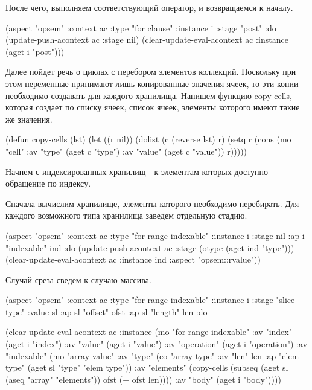 \documentclass[12pt,twoside,russian]{article}
\begin{document}
После чего, выполняем соответствующий оператор, и возвращаемся к началу.

\begin{ABMLCode}
(aspect "opsem" :context ac :type "for clause" :instance i 
  :stage "post" :do 
  (update-push-acontext ac :stage nil)
  (clear-update-eval-acontext ac :instance (aget i "post")))
\end{ABMLCode}

Далее пойдет речь о циклах с перебором элементов коллекций. Поскольку при этом переменные принимают лишь копированные значения ячеек, то эти копии необходимо создавать для каждого хранилища. Напишем функцию copy-cells, которая создает по списку ячеек, список ячеек, элементы которого имеют такие же значения.

\begin{ABMLCode}
(defun copy-cells (lst) 
  (let ((r nil)) (dolist (c (reverse lst) r) 
    (setq r (cons (mo "cell" :av "type" (aget c "type") 
                             :av "value" (aget c "value"))
                  r)))))
\end{ABMLCode}

Начнем с индексированных хранилищ - к элементам которых доступно обращение по индексу.

Сначала вычислим хранилище, элементы которого необходимо перебирать. Для каждого возможного типа хранилища заведем отдельную стадию.

\begin{ABMLCode}
(aspect "opsem" :context ac :type "for range indexable" :instance i 
  :stage nil :ap i "indexable" ind :do 
  (update-push-acontext ac :stage (otype (aget ind "type")))
  (clear-update-eval-acontext ac :instance ind :aspect "opsem::rvalue"))
\end{ABMLCode}

Случай среза сведем к случаю массива.

\begin{ABMLCode}
(aspect "opsem" :context ac :type "for range indexable" :instance i 
  :stage "slice type" :value sl :ap sl "offset" ofst 
  :ap sl "length" len :do 
  
  (clear-update-eval-acontext ac :instance (mo "for range indexable" 
  :av "index" (aget i "index") 
  :av "value" (aget i "value")
  :av "operation" (aget i "operation") 
  :av "indexable" (mo "array value" 
    :av "type" (co "array type" :av "len" len 
      :ap "elem type" (aget sl "type" "elem type"))
    :av "elements" (copy-cells 
      (subseq (aget sl (aseq "array" "elements")) ofst (+ ofst len))))
  :av "body" (aget i "body"))))
\end{ABMLCode}
\end{document}

